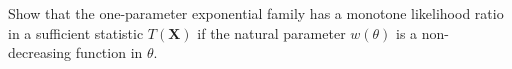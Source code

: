 
\begin{exercise}

Show that the one-parameter exponential family has a monotone likelihood
ratio in a sufficient statistic $T(\textbf{X})$ if the natural parameter
$w(\theta)$ is a non-decreasing function in $\theta$.

\end{exercise}


\begin{solution}

\phantom{}

\end{solution}

